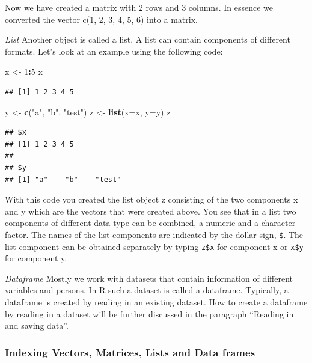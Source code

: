 \documentclass[]{book}
\newenvironment{Shaded}{\begin{snugshade}}{\end{snugshade}}
\newcommand{\KeywordTok}[1]{\textcolor[rgb]{0.13,0.29,0.53}{\textbf{#1}}}
\newcommand{\DataTypeTok}[1]{\textcolor[rgb]{0.13,0.29,0.53}{#1}}
\newcommand{\DecValTok}[1]{\textcolor[rgb]{0.00,0.00,0.81}{#1}}
\newcommand{\StringTok}[1]{\textcolor[rgb]{0.31,0.60,0.02}{#1}}
\newcommand{\OperatorTok}[1]{\textcolor[rgb]{0.81,0.36,0.00}{\textbf{#1}}}
\newcommand{\NormalTok}[1]{#1}
\theoremstyle{definition}
\theoremstyle{definition}
\theoremstyle{definition}
\theoremstyle{remark}
\begin{document}
Now we have created a matrix with 2 rows and 3 columns. In essence we
converted the vector c(1, 2, 3, 4, 5, 6) into a matrix.

\emph{List} Another object is called a list. A list can contain
components of different formats. Let's look at an example using the
following code:

\begin{Shaded}
\begin{Highlighting}[]
\NormalTok{x <-}\StringTok{ }\DecValTok{1}\OperatorTok{:}\DecValTok{5}
\NormalTok{x}
\end{Highlighting}
\end{Shaded}

\begin{verbatim}
## [1] 1 2 3 4 5
\end{verbatim}

\begin{Shaded}
\begin{Highlighting}[]
\NormalTok{y <-}\StringTok{ }\KeywordTok{c}\NormalTok{(}\StringTok{"a"}\NormalTok{, }\StringTok{"b"}\NormalTok{, }\StringTok{"test"}\NormalTok{)}
\NormalTok{z <-}\StringTok{ }\KeywordTok{list}\NormalTok{(}\DataTypeTok{x=}\NormalTok{x, }\DataTypeTok{y=}\NormalTok{y)}
\NormalTok{z}
\end{Highlighting}
\end{Shaded}

\begin{verbatim}
## $x
## [1] 1 2 3 4 5
## 
## $y
## [1] "a"    "b"    "test"
\end{verbatim}

With this code you created the list object z consisting of the two
components x and y which are the vectors that were created above. You
see that in a list two components of different data type can be
combined, a numeric and a character factor. The names of the list
components are indicated by the dollar sign, \texttt{\$}. The list
component can be obtained separately by typing \texttt{z\$x} for
component x or \texttt{x\$y} for component y.

\emph{Dataframe} Mostly we work with datasets that contain information
of different variables and persons. In R such a dataset is called a
dataframe. Typically, a dataframe is created by reading in an existing
dataset. How to create a dataframe by reading in a dataset will be
further discussed in the paragraph ``Reading in and saving data''.

\subsubsection{Indexing Vectors, Matrices, Lists and Data
frames}\label{indexing-vectors-matrices-lists-and-data-frames}
\end{document}
